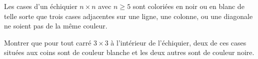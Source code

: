 \documentclass[varwidth]{standalone}
\begin{document}
    Les cases d'un \'echiquier $n \times n$ avec $n \geq 5$ sont colori\'ees en noir ou en blanc de telle sorte que trois cases adjacentes sur une ligne, une colonne, ou une diagonale ne soient pas de la m\^eme couleur.

    Montrer que pour tout carr\'e $3 \times 3$ \`a l'int\'erieur de l'\'echiquier, deux de ces cases situ\'ees aux coins sont de couleur blanche et les deux autres sont de couleur noire.
\end{document}
